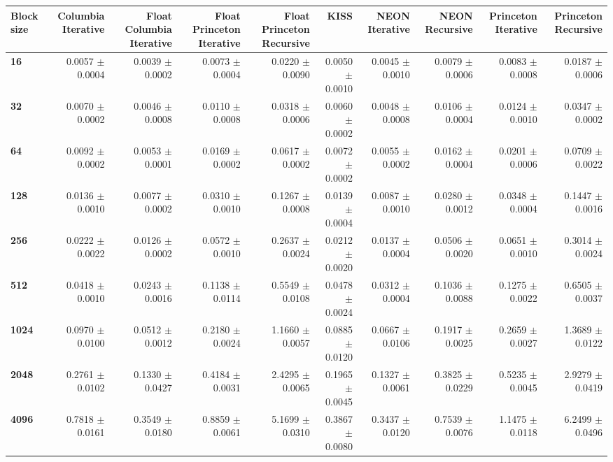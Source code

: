 \begin{tabular}{lrrrrrrrrr}\toprule
\textbf{Block size}  & \textbf{Columbia Iterative} & \textbf{Float Columbia Iterative} & \textbf{Float Princeton Iterative} & \textbf{Float Princeton Recursive} & \textbf{KISS} & \textbf{NEON Iterative} & \textbf{NEON Recursive} & \textbf{Princeton Iterative} & \textbf{Princeton Recursive}\\\midrule
\textbf{16}  & 0.0057 $\pm$ 0.0004 & 0.0039 $\pm$ 0.0002 & 0.0073 $\pm$ 0.0004 & 0.0220 $\pm$ 0.0090 & 0.0050 $\pm$ 0.0010 & 0.0045 $\pm$ 0.0010 & 0.0079 $\pm$ 0.0006 & 0.0083 $\pm$ 0.0008 & 0.0187 $\pm$ 0.0006\\
\textbf{32}  & 0.0070 $\pm$ 0.0002 & 0.0046 $\pm$ 0.0008 & 0.0110 $\pm$ 0.0008 & 0.0318 $\pm$ 0.0006 & 0.0060 $\pm$ 0.0002 & 0.0048 $\pm$ 0.0008 & 0.0106 $\pm$ 0.0004 & 0.0124 $\pm$ 0.0010 & 0.0347 $\pm$ 0.0002\\
\textbf{64}  & 0.0092 $\pm$ 0.0002 & 0.0053 $\pm$ 0.0001 & 0.0169 $\pm$ 0.0002 & 0.0617 $\pm$ 0.0002 & 0.0072 $\pm$ 0.0002 & 0.0055 $\pm$ 0.0002 & 0.0162 $\pm$ 0.0004 & 0.0201 $\pm$ 0.0006 & 0.0709 $\pm$ 0.0022\\
\textbf{128}  & 0.0136 $\pm$ 0.0010 & 0.0077 $\pm$ 0.0002 & 0.0310 $\pm$ 0.0010 & 0.1267 $\pm$ 0.0008 & 0.0139 $\pm$ 0.0004 & 0.0087 $\pm$ 0.0010 & 0.0280 $\pm$ 0.0012 & 0.0348 $\pm$ 0.0004 & 0.1447 $\pm$ 0.0016\\
\textbf{256}  & 0.0222 $\pm$ 0.0022 & 0.0126 $\pm$ 0.0002 & 0.0572 $\pm$ 0.0010 & 0.2637 $\pm$ 0.0024 & 0.0212 $\pm$ 0.0020 & 0.0137 $\pm$ 0.0004 & 0.0506 $\pm$ 0.0020 & 0.0651 $\pm$ 0.0010 & 0.3014 $\pm$ 0.0024\\
\textbf{512}  & 0.0418 $\pm$ 0.0010 & 0.0243 $\pm$ 0.0016 & 0.1138 $\pm$ 0.0114 & 0.5549 $\pm$ 0.0108 & 0.0478 $\pm$ 0.0024 & 0.0312 $\pm$ 0.0004 & 0.1036 $\pm$ 0.0088 & 0.1275 $\pm$ 0.0022 & 0.6505 $\pm$ 0.0037\\
\textbf{1024}  & 0.0970 $\pm$ 0.0100 & 0.0512 $\pm$ 0.0012 & 0.2180 $\pm$ 0.0024 & 1.1660 $\pm$ 0.0057 & 0.0885 $\pm$ 0.0120 & 0.0667 $\pm$ 0.0106 & 0.1917 $\pm$ 0.0025 & 0.2659 $\pm$ 0.0027 & 1.3689 $\pm$ 0.0122\\
\textbf{2048}  & 0.2761 $\pm$ 0.0102 & 0.1330 $\pm$ 0.0427 & 0.4184 $\pm$ 0.0031 & 2.4295 $\pm$ 0.0065 & 0.1965 $\pm$ 0.0045 & 0.1327 $\pm$ 0.0061 & 0.3825 $\pm$ 0.0229 & 0.5235 $\pm$ 0.0045 & 2.9279 $\pm$ 0.0419\\
\textbf{4096}  & 0.7818 $\pm$ 0.0161 & 0.3549 $\pm$ 0.0180 & 0.8859 $\pm$ 0.0061 & 5.1699 $\pm$ 0.0310 & 0.3867 $\pm$ 0.0080 & 0.3437 $\pm$ 0.0120 & 0.7539 $\pm$ 0.0076 & 1.1475 $\pm$ 0.0118 & 6.2499 $\pm$ 0.0496\\

\end{tabular}
